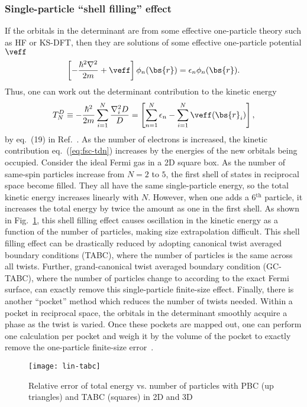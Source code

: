 \subsubsection{Single-particle ``shell filling'' effect}
If the orbitals in the determinant are from some effective one-particle theory such as HF or KS-DFT, then they are solutions of some effective one-particle potential $\veff$
\begin{align}
\left[
-\dfrac{\hbar^2\nabla^2}{2m} + \veff
\right] \phi_n(\bs{r}) = \epsilon_n\phi_n(\bs{r}).
\end{align}
Thus, one can work out the determinant contribution to the kinetic energy
\begin{align} \label{eq:fsc-tdn}
T^D_N \equiv -\dfrac{\hbar^2}{2m}\sum\limits_{i=1}^N \dfrac{\nabla_i^2D}{D} = \left[
\sum\limits_{n=1}^N\epsilon_n - \sum\limits_{i=1}^N \veff(\bs{r}_i)
\right],
\end{align}
by eq.~(19) in Ref.~\cite{Holzmann2016}. As the number of electrons is increased, the kinetic contribution eq.~(\ref{eq:fsc-tdn}) increases by the energies of the new orbitals being occupied. Consider the ideal Fermi gas in a 2D square box. As the number of same-spin particles increase from $N=2$ to $5$, the first shell of states in reciprocal space become filled. They all have the same single-particle energy, so the total kinetic energy increases linearly with $N$. However, when one adds a 6$^{\text{th}}$ particle, it increases the total energy by twice the amount as one in the first shell. As shown in Fig.~\ref{fig:fsc-lin-tabc}, this shell filling effect causes oscillation in the kinetic energy as a function of the number of particles, making size extrapolation difficult. This shell filling effect can be drastically reduced by adopting canonical twist averaged boundary conditions (TABC), where the number of particles is the same across all twists. Further, grand-canonical twist averaged boundary condition (GC-TABC), where the number of particles change to according to the exact Fermi surface, can exactly remove this single-particle finite-size effect. Finally, there is another ``pocket'' method which reduces the number of twists needed. Within a pocket in reciprocal space, the orbitals in the determinant smoothly acquire a phase as the twist is varied. Once these pockets are mapped out, one can perform one calculation per pocket and weigh it by the volume of the pocket to exactly remove the one-particle finite-size error~\cite{Holzmann2016}.

\begin{figure}[h]
\centering
\texttt{[image: lin-tabc]}
\caption{Relative error of total energy vs. number of particles with PBC (up triangles) and TABC (squares) in 2D and 3D~\cite{Lin2001}}
\label{fig:fsc-lin-tabc}
\end{figure}

